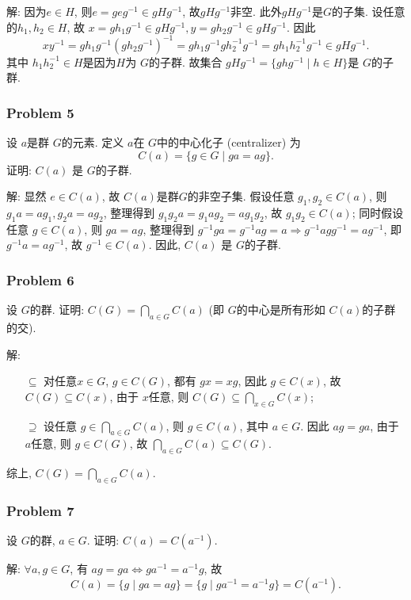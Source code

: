 \documentclass[a4paper,12pt]{ctexart}
\begin{document}
  解: 因为$e\in H$, 则$e=geg^{-1}\in gHg^{-1}$, 故$gHg^{-1}$非空. 此外$gHg^{-1}$是$G$的子集. 设任意的$ h_1,h_2\in H $, 故 $ x=gh_1g^{-1}\in gHg^{-1},y=gh_2g^{-1}\in gHg^{-1} $. 因此
  \[xy^{-1}=gh_1g^{-1}(gh_2g^{-1})^{-1}=gh_1g^{-1}gh_2^{-1}g^{-1}=gh_1h_2^{-1}g^{-1}\in gHg^{-1}.\]
  其中 $ h_1h_2^{-1}\in H $是因为$ H $为 $ G $的子群. 故集合 $ gHg^{-1}=\{ghg^{-1}\mid h\in H\} $是 $ G $的子群.

\subsubsection*{Problem 5}
  设 $ a $是群 $ G $的元素. 定义 $ a $在 $ G $中的中心化子 (centralizer) 为 
  \[C(a)=\{g\in G\mid ga=ag\}.\]
  证明: $ C(a) $ 是 $ G $的子群.

  解: 显然 $ e\in C(a) $, 故 $ C(a) $是群$G$的非空子集. 假设任意 $ g_1,g_2\in C(a) $, 则 $ g_1a=ag_1,g_2a=ag_2 $, 整理得到
  $ g_1g_2a=g_1ag_2=ag_1g_2 $, 故 $ g_1g_2\in C(a) $; 同时假设任意 $ g\in C(a) $, 则  $ ga=ag $, 整理得到 
  $ g^{-1}ga=g^{-1}ag=a\Rightarrow g^{-1}agg^{-1}=ag^{-1} $, 即 $ g^{-1}a=ag^{-1} $, 故 $ g^{-1}\in C(a) $.
  因此, $ C(a) $ 是 $ G $的子群.

\subsubsection*{Problem 6}
  设 $ G $的群. 证明: $ C(G)=\bigcap_{a\in G}C(a) $ (即 $ G $的中心是所有形如 $ C(a) $的子群的交).

  解: \begin{enumerate}
    \item[$ \subseteq $] 对任意$ x\in G $, $ g\in C(G) $, 都有 $ gx=xg $, 因此 $ g\in C(x) $, 故 $ C(G)\subseteq C(x) $, 由于 $ x $任意, 则 $ C(G)\subseteq\bigcap_{x\in G}C(x) $;
    \item[$ \supseteq $] 设任意 $ g\in\bigcap_{a\in G}C(a) $, 则 $ g\in C(a) $, 
    其中 $ a\in G $. 因此 $ ag=ga $, 由于 $ a $任意, 则 $ g\in C(G) $, 故 $ \bigcap_{a\in G}C(a)\subseteq C(G) $.
  \end{enumerate}
  综上,  $ C(G)=\bigcap_{a\in G}C(a) $.

\subsubsection*{Problem 7}
  设 $ G $的群, $ a\in G $. 证明: $ C(a)=C(a^{-1}) $.

  解: $ \forall a,g\in G $, 有 $ ag=ga\Leftrightarrow ga^{-1}=a^{-1}g $, 故 
  \[C(a)=\{g\mid ga=ag\}=\{g\mid ga^{-1}=a^{-1}g\}=C(a^{-1}).\]
  
\end{document}
